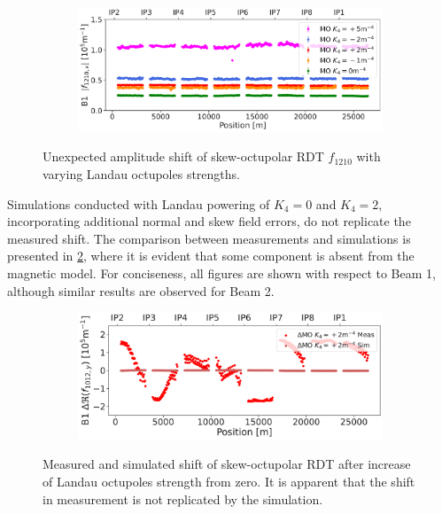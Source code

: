 \begin{figure}[!htb]
    \centering
    \begin{subfigure}{0.8\textwidth}
        \includegraphics[width=\textwidth]{./images/skew_octupoles/f1210_AMP_all_measurements.pdf}
    \end{subfigure}
    \caption{Unexpected amplitude shift of skew-octupolar RDT $f_{1210}$ with varying Landau
    octupoles strengths.}
    \label{fig:skew_octupolar:mo_different_levels_meas}
\end{figure}

Simulations conducted with Landau powering of $K_4 = 0$ and $K_4 = 2$, incorporating additional
normal and skew field errors, do not replicate the measured shift. The comparison between
measurements and simulations is presented in \cref{fig:skew_octupolar:mo_meas_vs_sim_+2}, where it
is evident that some component is absent from the magnetic model. For conciseness, all figures are
shown with respect to Beam 1, although similar results are observed for Beam 2.

\begin{figure}[!htb]
    \centering
    \begin{subfigure}{0.8\textwidth}
        \includegraphics[width=\textwidth]{./images/skew_octupoles/f1012_meas_vs_sim_0shift.pdf}
    \end{subfigure}
    \caption{Measured and simulated shift of skew-octupolar RDT after increase of Landau octupoles
    strength from zero. It is apparent that the shift in measurement is not replicated by the
    simulation.}
    \label{fig:skew_octupolar:mo_meas_vs_sim_+2}
\end{figure}



